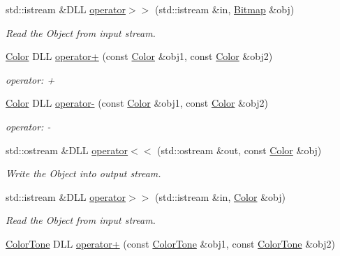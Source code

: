 \begin{DoxyCompactItemize}
std::istream \&DLL \hyperlink{namespace_f2_c_a08fbe6620774ad5f203a8602049f7beb}{operator$>$$>$} (std::istream \&in, \hyperlink{class_f2_c_1_1_bitmap}{Bitmap} \&obj)
\begin{DoxyCompactList}\small\item\em Read the Object from input stream. \item\end{DoxyCompactList}\item 
\hypertarget{namespace_f2_c_a5f7f27346e2a0a1782cdc314c3882c2d}{
\hyperlink{class_f2_c_1_1_color}{Color} DLL \hyperlink{namespace_f2_c_a5f7f27346e2a0a1782cdc314c3882c2d}{operator+} (const \hyperlink{class_f2_c_1_1_color}{Color} \&obj1, const \hyperlink{class_f2_c_1_1_color}{Color} \&obj2)}
\label{namespace_f2_c_a5f7f27346e2a0a1782cdc314c3882c2d}

\begin{DoxyCompactList}\small\item\em operator: + \item\end{DoxyCompactList}\item 
\hypertarget{namespace_f2_c_abf2a0fe00839e11c20ed5650d801a72a}{
\hyperlink{class_f2_c_1_1_color}{Color} DLL \hyperlink{namespace_f2_c_abf2a0fe00839e11c20ed5650d801a72a}{operator-\/} (const \hyperlink{class_f2_c_1_1_color}{Color} \&obj1, const \hyperlink{class_f2_c_1_1_color}{Color} \&obj2)}
\label{namespace_f2_c_abf2a0fe00839e11c20ed5650d801a72a}

\begin{DoxyCompactList}\small\item\em operator: -\/ \item\end{DoxyCompactList}\item 
std::ostream \&DLL \hyperlink{namespace_f2_c_a88ade2ba40100d1fb40d571da7ca6297}{operator$<$$<$} (std::ostream \&out, const \hyperlink{class_f2_c_1_1_color}{Color} \&obj)
\begin{DoxyCompactList}\small\item\em Write the Object into output stream. \item\end{DoxyCompactList}\item 
std::istream \&DLL \hyperlink{namespace_f2_c_af54a39901858a2eb792213aea0cf773b}{operator$>$$>$} (std::istream \&in, \hyperlink{class_f2_c_1_1_color}{Color} \&obj)
\begin{DoxyCompactList}\small\item\em Read the Object from input stream. \item\end{DoxyCompactList}\item 
\hypertarget{namespace_f2_c_a30787062940f856f19105f1e39416263}{
\hyperlink{class_f2_c_1_1_color_tone}{ColorTone} DLL \hyperlink{namespace_f2_c_a30787062940f856f19105f1e39416263}{operator+} (const \hyperlink{class_f2_c_1_1_color_tone}{ColorTone} \&obj1, const \hyperlink{class_f2_c_1_1_color_tone}{ColorTone} \&obj2)}
\label{namespace_f2_c_a30787062940f856f19105f1e39416263}


\end{DoxyCompactItemize}
